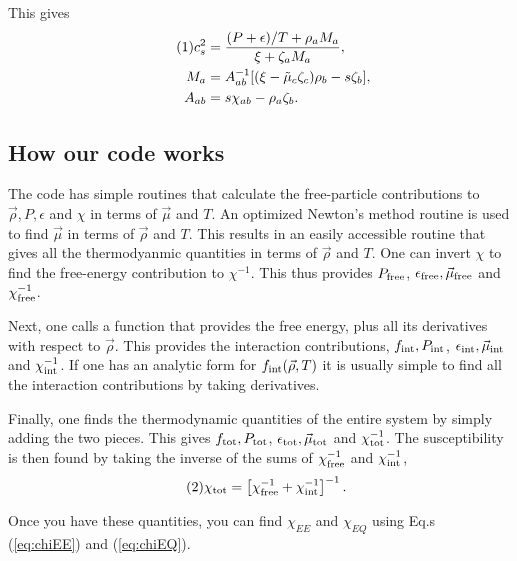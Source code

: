 \documentclass[12pt]{article}
\numberwithin{equation}{section}
\numberwithin{figure}{section}
\newcommand\eqnumber{\addtocounter{equation}{1}\tag{\theequation}}
\begin{document}
This gives
\begin{align*}\eqnumber\label{eq:f12}
c_s^2&=\frac{(P+\epsilon)/T+\rho_a M_a}{\xi+\zeta_aM_a},\\
M_a&=A^{-1}_{ab}[(\xi-\tilde{\mu}_c\zeta_c)\rho_b-s\zeta_b],\\
A_{ab}&=s\chi_{ab}-\rho_a\zeta_b.
\end{align*}

\subsection{How our code works}

The code has simple routines that calculate the free-particle contributions to $\vec{\rho},P,\epsilon$ and $\chi$ in terms of $\vec{\mu}$ and $T$. An optimized Newton's method routine is used to find $\vec{\mu}$ in terms of $\vec{\rho}$ and $T$. This results in an easily accessible routine that gives all the thermodyanmic quantities in terms of $\vec{\rho}$ and $T$. One can invert $\chi$ to find the free-energy contribution to $\chi^{-1}$. This thus provides $P_{\rm free}$, $\epsilon_{\rm free}, \vec{\mu}_{\rm free}$ and $\chi^{-1}_{\rm free}$.

Next, one calls a function that provides the free energy, plus all its derivatives with respect to $\vec{\rho}$. This provides the interaction contributions, $f_{\rm int}, P_{\rm int}$, $\epsilon_{\rm int}, \vec{\mu}_{\rm int}$ and $\chi^{-1}_{\rm int}$. If one has an analytic form for $f_{\rm int}(\vec{\rho},T)$ it is usually simple to find all the interaction contributions by taking derivatives.

Finally, one finds the thermodynamic quantities of the entire system by simply adding the two pieces. This gives $f_{\rm tot}, P_{\rm tot}$, $\epsilon_{\rm tot}, \vec{\mu}_{\rm tot}$ and $\chi^{-1}_{\rm tot}$. The susceptibility is then found by taking the inverse of the sums of $\chi^{-1}_{\rm free}$ and $\chi^{-1}_{\rm int}$,
\begin{align*}\eqnumber
\chi_{\rm tot}&=\left[\chi^{-1}_{\rm free}+\chi^{-1}_{\rm int}\right]^{-1}.
\end{align*}

Once you have these quantities, you can find $\chi_{EE}$ and $\chi_{EQ}$ using Eq.s (\ref{eq:chiEE}) and (\ref{eq:chiEQ}).
\end{document}
